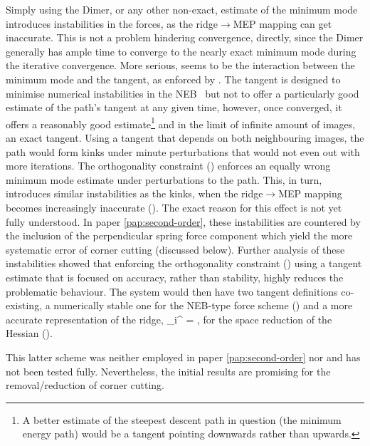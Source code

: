 Simply using the Dimer, or any other non-exact, estimate of the minimum mode introduces instabilities in the forces, as the ridge$\rightarrow$MEP mapping can get inaccurate.
This is not a problem hindering convergence, directly, since the Dimer generally has ample time to converge to the nearly exact minimum mode during the iterative convergence.
More serious, seems to be the interaction between the minimum mode and the tangent, as enforced by .
The tangent is designed to minimise numerical instabilities in the NEB~\cite{neb-tangent-2000} but not to offer a particularly good estimate of the path's tangent at any given time, however, once converged, it offers a reasonably good estimate\footnote{A better estimate of the steepest descent path in question (the minimum energy path) would be a tangent pointing downwards rather than upwards.} and in the limit of infinite amount of images, an exact tangent.
Using a tangent that depends on both neighbouring images, the path would form kinks under minute perturbations that would not even out with more iterations.
The orthogonality constraint () enforces an equally wrong minimum mode estimate under perturbations to the path.
This, in turn, introduces similar instabilities as the kinks, when the ridge$\rightarrow$MEP mapping becomes increasingly inaccurate ().
The exact reason for this effect is not yet fully understood.
In paper \ref{pap:second-order}, these instabilities are countered by the inclusion of the perpendicular spring force component which yield the more systematic error of corner cutting (discussed below).
Further analysis of these instabilities showed that enforcing the orthogonality constraint () using a tangent estimate that is focused on accuracy, rather than stability, highly reduces the problematic behaviour.
The system would then have two tangent definitions co-existing, a numerically stable one for the NEB-type force scheme () and a more accurate representation of the ridge,
\uvt_i^ = ,
\eeq
for the space reduction of the Hessian ().

This latter scheme was neither employed in paper \ref{pap:second-order} nor  and has not been tested fully.
Nevertheless, the initial results are promising for the removal/reduction of corner cutting.

